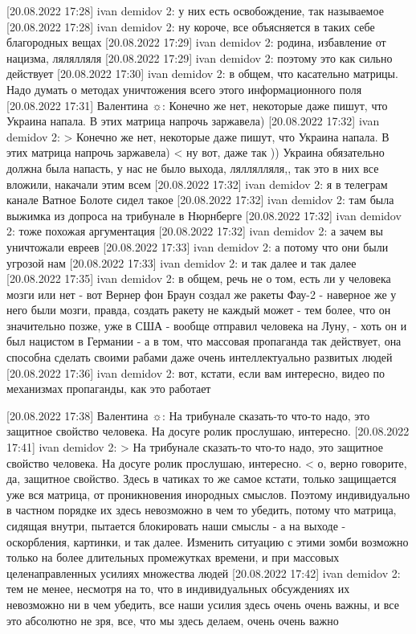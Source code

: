 [20.08.2022 17:28] ivan demidov 2: у них есть освобождение, так называемое
[20.08.2022 17:28] ivan demidov 2: ну короче, все объясняется в таких себе благородных вещах
[20.08.2022 17:29] ivan demidov 2: родина, избавление от нацизма, лялялляля
[20.08.2022 17:29] ivan demidov 2: поэтому это как сильно действует
[20.08.2022 17:30] ivan demidov 2: в общем, что касательно матрицы. Надо думать о методах уничтожения всего этого информационного поля
[20.08.2022 17:31] Валентина ☼: Конечно же нет, некоторые даже пишут, что Украина напала. В этих матрица напрочь заржавела)
[20.08.2022 17:32] ivan demidov 2: 
> Конечно же нет, некоторые даже пишут, что Украина напала. В этих матрица напрочь заржавела) <
ну вот, даже так )) Украина обязательно должна была напасть, у нас не было выхода, ляллялляля,, так это в них все вложили, накачали этим всем
[20.08.2022 17:32] ivan demidov 2: я в телеграм канале Ватное Болоте сидел такое
[20.08.2022 17:32] ivan demidov 2: там была выжимка из допроса на трибунале в Нюрнберге
[20.08.2022 17:32] ivan demidov 2: тоже похожая аргументация
[20.08.2022 17:32] ivan demidov 2: а зачем вы уничтожали евреев
[20.08.2022 17:33] ivan demidov 2: а потому что они были угрозой нам
[20.08.2022 17:33] ivan demidov 2: и так далее и так далее
[20.08.2022 17:35] ivan demidov 2: в общем, речь не о том, есть ли у человека мозги или нет - вот Вернер фон Браун создал же ракеты Фау-2 - наверное же у него были мозги, правда, создать ракету не каждый может - тем более, что он значительно позже, уже в США - вообще отправил человека на Луну, - хоть он и был нацистом в Германии - а в том, что массовая пропаганда так действует, она способна сделать своими рабами даже очень интеллектуально развитых людей
[20.08.2022 17:36] ivan demidov 2: вот, кстати, если вам интересно, видео по механизмах пропаганды, как это работает

[20.08.2022 17:38] Валентина ☼: На трибунале сказать-то что-то надо, это защитное свойство человека. На досуге ролик прослушаю, интересно.
[20.08.2022 17:41] ivan demidov 2: 
> На трибунале сказать-то что-то надо, это защитное свойство человека. На досуге ролик прослушаю, интересно. <
о, верно говорите, да, защитное свойство. Здесь в чатиках то же самое кстати, только защищается уже вся матрица, от проникновения инородных смыслов. Поэтому индивидуально в частном порядке их здесь невозможно в чем то убедить, потому что матрица, сидящая внутри, пытается блокировать наши смыслы - а на выходе - оскорбления, картинки, и так далее. Изменить ситуацию с этими зомби возможно только на более длительных промежутках времени, и при массовых целенаправленных усилиях множества людей
[20.08.2022 17:42] ivan demidov 2: тем не менее, несмотря на то, что в индивидуальных обсуждениях их невозможно ни в чем убедить, все наши усилия здесь очень очень важны, и все это абсолютно не зря, все, что мы здесь делаем, очень очень важно

